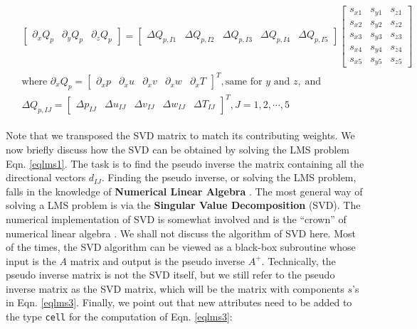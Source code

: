 \documentclass[12pt, letterpaper]{report}
\begin{document}
\begin{align}\label{eqlms3}
   \begin{split}
   &\begin{bmatrix}\partial_x Q_{p} &\partial_y Q_{p} &\partial_z Q_{p}\end{bmatrix} = 
   \begin{bmatrix}\Delta Q_{p,I1} &\Delta Q_{p,I2} &\Delta Q_{p,I3} &\Delta Q_{p,I4} &\Delta
      Q_{p,I5}\end{bmatrix}
   \begin{bmatrix}
      s_{x1} & s_{y1} & s_{z1} \\
      s_{x2} & s_{y2} & s_{z2} \\
      s_{x3} & s_{y3} & s_{z3} \\
      s_{x4} & s_{y4} & s_{z4} \\
      s_{x5} & s_{y5} & s_{z5}
   \end{bmatrix} \\
    &\textrm{where } \partial_x Q_p = \begin{bmatrix}\partial_x p &\partial_x u &\partial_x v
    &\partial_x w &\partial_x T \end{bmatrix}^T, \textrm{same for } y \textrm{ and } z, \; \textrm{
    and}\\ &\Delta Q_{p,IJ} = \begin{bmatrix}\Delta p_{IJ} &\Delta u_{IJ} &\Delta v_{IJ} &\Delta
    w_{IJ} &\Delta T_{IJ}\end{bmatrix}^T, J = 1,2,\cdots,5
   \end{split}
\end{align}

Note that we transposed the SVD matrix to match its contributing weights. We now briefly discuss how
the SVD can be obtained by solving the LMS problem Eqn. \ref{eqlms1}. The task is to find the
pseudo inverse the matrix containing all the directional vectors $d_{IJ}$. Finding the pseudo
inverse, or solving the LMS problem, falls in the knowledge of {\bf Numerical Linear Algebra}
\cite{trefethen1997numerical}. The most general way of solving a LMS problem is via the {\bf
Singular Value Decomposition} (SVD). The numerical implementation of SVD is somewhat involved and is
the ``crown'' of numerical linear algebra \cite{golub2013matrix}. We shall not discuss the algorithm
of SVD here. Most of the times, the SVD algorithm can be viewed as a black-box subroutine whose
input is the $A$ matrix and output is the pseudo inverse $A^+$. Technically, the pseudo inverse
matrix is not the SVD itself, but we still refer to the pseudo inverse matrix as the SVD matrix,
which will be the matrix with components $s$'s in Eqn. \ref{eqlms3}. Finally, we point out that
new attributes need to be added to the type \verb+cell+ for the computation of Eqn. \ref{eqlms3}:
\end{document}
